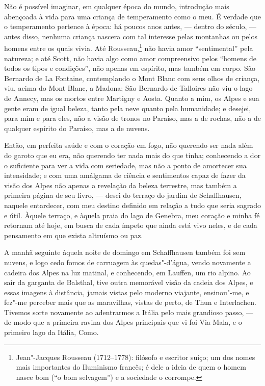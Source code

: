 Não é possível imaginar, em qualquer época do mundo, introdução mais
abençoada à vida para uma criança de temperamento como o meu. É verdade
que o temperamento pertence à época: há poucos anos antes, --- dentro do
século, --- antes disso, nenhuma criança nascera com tal interesse pelas
montanhas ou pelos homens entre os quais vivia. Até Rousseau,\footnote{Jean"-Jacques
  Rousseau (1712--1778): filósofo e escritor suíço; um dos nomes mais
  importantes do Iluminismo francês; é dele a ideia de quem o homem
  nasce bom (``o bom selvagem'') e a sociedade o corrompe.} não havia amor ``sentimental'' pela natureza; e até Scott,
não havia algo como amor compreensivo pelos ``homens de todos os tipos e
condições'', não apenas em espírito, mas também em corpo. São Bernardo
de La Fontaine, contemplando o Mont Blanc com seus olhos de criança,
viu, acima do Mont Blanc, a Madona; São Bernardo de Talloires não viu o
lago de Annecy, mas os mortos entre Martigny e Aosta. Quanto a mim, os
Alpes e sua gente eram de igual beleza, tanto pela neve quanto pela
humanidade; e desejei, para mim e para eles, não a visão de tronos no
Paraíso, mas a de rochas, não a de qualquer espírito do Paraíso, mas a
de nuvens.

Então, em perfeita saúde e com o coração em fogo, não querendo ser
nada além do garoto que eu era, não querendo ter nada mais do que tinha;
conhecendo a dor o suficiente para ver a vida com seriedade, mas não a
ponto de amortecer sua intensidade; e com uma amálgama de ciência e
sentimentos capaz de fazer da visão dos Alpes não apenas a revelação da
beleza terrestre, mas também a primeira página de seu livro, --- desci do
terraço do jardim de Schaffhausen, naquele entardecer, com meu destino
definido em relação a tudo que seria sagrado e útil. Àquele terraço, e
àquela praia do lago de Genebra, meu coração e minha fé retornam até
hoje, em busca de cada ímpeto que ainda está vivo neles, e de cada
pensamento em que exista altruísmo ou paz.

A manhã seguinte àquela noite de domingo em Schaffhausen também foi
sem nuvens, e logo cedo fomos de carruagem às quedas"-d'água, vendo
novamente a cadeira dos Alpes na luz matinal, e conhecendo, em Lauffen,
um rio alpino. Ao sair da garganta de Balsthal, tive outra memorável
visão da cadeia dos Alpes, e essas imagens à distância, jamais vistas
pelo moderno viajante, ensinou"-me, e fez"-me perceber mais que as
maravilhas, vistas de perto, de Thun e Interlachen. Tivemos sorte
novamente ao adentrarmos a Itália pelo mais grandioso passo, --- de modo
que a primeira ravina dos Alpes principais que vi foi Via Mala, e o
primeiro lago da Itália, Como.

